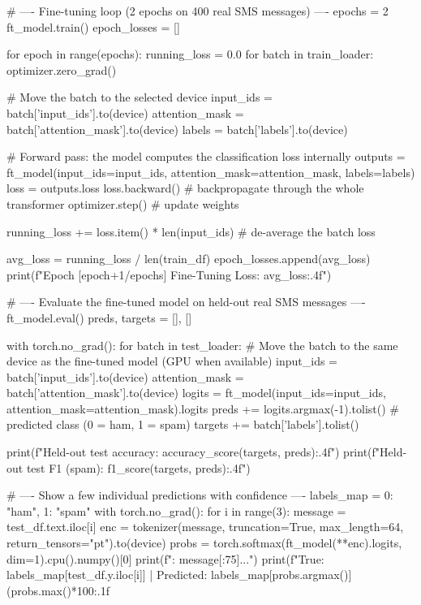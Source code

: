 \begin{codebox}[title={Fine-tuning loop (2 epochs on 400 real SMS messages)}]
# ---- Fine-tuning loop (2 epochs on 400 real SMS messages) ----
epochs = 2
ft_model.train()
epoch_losses = []

for epoch in range(epochs):
    running_loss = 0.0
    for batch in train_loader:
        optimizer.zero_grad()

        # Move the batch to the selected device
        input_ids = batch['input_ids'].to(device)
        attention_mask = batch['attention_mask'].to(device)
        labels = batch['labels'].to(device)

        # Forward pass: the model computes the classification loss internally
        outputs = ft_model(input_ids=input_ids, attention_mask=attention_mask, labels=labels)
        loss = outputs.loss
        loss.backward()      # backpropagate through the whole transformer
        optimizer.step()     # update weights

        running_loss += loss.item() * len(input_ids)   # de-average the batch loss

    avg_loss = running_loss / len(train_df)
    epoch_losses.append(avg_loss)
    print(f"Epoch [{epoch+1}/{epochs}] Fine-Tuning Loss: {avg_loss:.4f}")
\end{codebox}

\begin{codebox}[title={Evaluate the fine-tuned model on held-out real SMS messages}]
# ---- Evaluate the fine-tuned model on held-out real SMS messages ----
ft_model.eval()
preds, targets = [], []

with torch.no_grad():
    for batch in test_loader:
        # Move the batch to the same device as the fine-tuned model (GPU when available)
        input_ids = batch['input_ids'].to(device)
        attention_mask = batch['attention_mask'].to(device)
        logits = ft_model(input_ids=input_ids, attention_mask=attention_mask).logits
        preds += logits.argmax(-1).tolist()       # predicted class (0 = ham, 1 = spam)
        targets += batch['labels'].tolist()

print(f"Held-out test accuracy: {accuracy_score(targets, preds):.4f}")
print(f"Held-out test F1 (spam): {f1_score(targets, preds):.4f}")

# ---- Show a few individual predictions with confidence ----
labels_map = {0: "ham", 1: "spam"}
with torch.no_grad():
    for i in range(3):
        message = test_df.text.iloc[i]
        enc = tokenizer(message, truncation=True, max_length=64, return_tensors="pt").to(device)
        probs = torch.softmax(ft_model(**enc).logits, dim=1).cpu().numpy()[0]
        print(f"\nMessage: {message[:75]}...")
        print(f"True: {labels_map[test_df.y.iloc[i]]} | Predicted: {labels_map[probs.argmax()]} ({probs.max()*100:.1f}%
\end{codebox}
